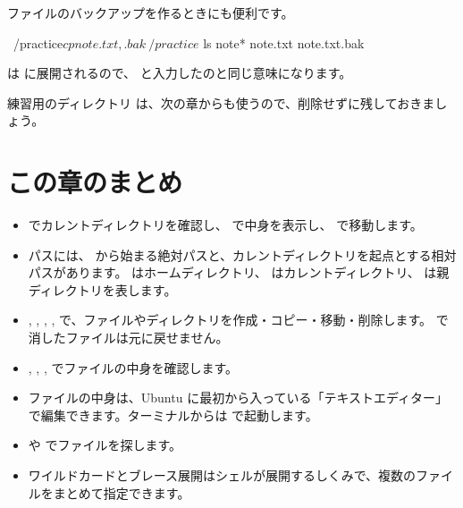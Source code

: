 ファイルのバックアップを作るときにも便利です。

\begin{terminal}[バックアップを作る]
~/practice$ cp note.txt{,.bak}
~/practice$ ls note*
note.txt  note.txt.bak
\end{terminal}

 は  に展開されるので、 と入力したのと同じ意味になります。

練習用のディレクトリ  は、次の章からも使うので、削除せずに残しておきましょう。

\section*{この章のまとめ}

\begin{itemize}
  \item {} でカレントディレクトリを確認し、 で中身を表示し、 で移動します。
  \item パスには、\cmd{/} から始まる絶対パスと、カレントディレクトリを起点とする相対パスがあります。\cmd{\textasciitilde} はホームディレクトリ、 はカレントディレクトリ、 は親ディレクトリを表します。
  \item {}, , , ,  で、ファイルやディレクトリを作成・コピー・移動・削除します。 で消したファイルは元に戻せません。
  \item {}, , ,  でファイルの中身を確認します。
  \item ファイルの中身は、Ubuntu に最初から入っている「テキストエディター」で編集できます。ターミナルからは  で起動します。
  \item {} や  でファイルを探します。
  \item ワイルドカードとブレース展開はシェルが展開するしくみで、複数のファイルをまとめて指定できます。
\end{itemize}


